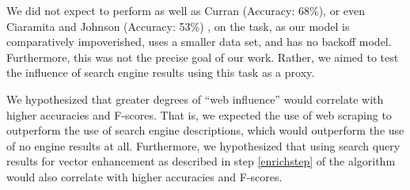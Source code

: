 \documentclass{article}
\begin{document}
We did not expect to perform as well as Curran (Accuracy: 68\%), or even Ciaramita and Johnson (Accuracy: 53\%) \cite{curran}, on the task, as our model is comparatively impoverished, uses a smaller data set, and has no backoff model. 
Furthermore, this was not the precise goal of our work. 
Rather, we aimed to test the influence of search engine results using this task as a proxy.

We hypothesized that greater degrees of ``web influence'' would correlate with higher accuracies and F-scores. 
That is, we expected the use of web scraping to outperform the use of search engine descriptions, which would outperform the use of no engine results at all.
Furthermore, we hypothesized that using search query results for vector enhancement as described in step \ref{enrichstep} of the algorithm would also correlate with higher accuracies and F-scores.
\end{document}
